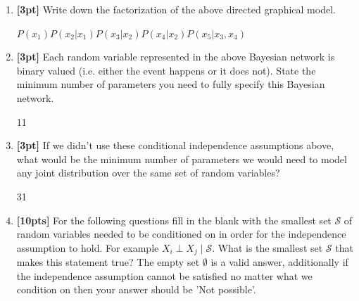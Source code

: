\begin{enumerate}
\item \textbf{[3pt]} Write down the factorization of the above directed graphical model.

\begin{tcolorbox}[fit,height=1cm, width=15cm, blank, borderline={1pt}{-2pt},nobeforeafter]
\begin{center}\LARGE $P(x_1)P(x_2|x_1)P(x_3|x_2)P(x_4|x_2)P(x_5|x_3,x_4)$ \end{center}
\end{tcolorbox}


\item \textbf{[3pt]} Each random variable represented in the above Bayesian network is binary valued (i.e. either the event happens or it does not). State the minimum number of parameters you need to fully specify  this Bayesian network.

\begin{tcolorbox}[fit,height=1cm, width=2cm, blank, borderline={1pt}{-2pt},nobeforeafter]
\begin{center}\huge 11\end{center}
\end{tcolorbox}


\item \textbf{[3pt]} If we didn't use these conditional independence assumptions above, what would be the minimum number of parameters we would need to model any joint distribution over the same set of random variables?

\begin{tcolorbox}[fit,height=1cm, width=2cm, blank, borderline={1pt}{-2pt},nobeforeafter]
\begin{center}\huge 31\end{center}
\end{tcolorbox}



\item \textbf{[10pts]} For the following questions fill in the blank with the smallest set $\mathcal{S}$ of random variables needed to be conditioned on in order for the independence assumption to hold. For example $X_i \perp X_j \mid \mathcal{S}$. What is the smallest set $\mathcal{S}$ that makes this statement true? The empty set $\emptyset$ is a valid answer, additionally if the independence assumption cannot be satisfied no matter what we condition on then your answer should be 'Not possible'.
\begin{enumerate}


\end{enumerate}
\end{enumerate}
